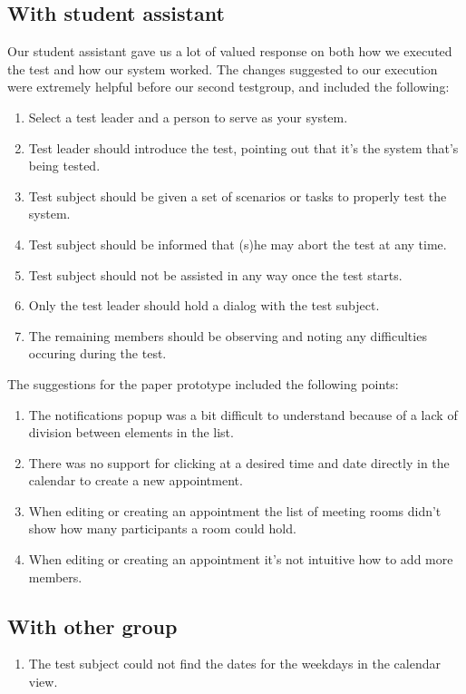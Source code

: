 \documentclass{article}
\begin{document}
\subsection{With student assistant}
Our student assistant gave us a lot of valued response on both how we executed the test and how our system worked. The changes suggested to our execution were extremely helpful before our second testgroup, and included the following:
\begin{enumerate}
\item Select a test leader and a person to serve as your system.
\item Test leader should introduce the test, pointing out that it's the system that's being tested. 
\item Test subject should be given a set of scenarios or tasks to properly test the system. 
\item Test subject should be informed that (s)he may abort the test at any time.
\item Test subject should not be assisted in any way once the test starts.
\item Only the test leader should hold a dialog with the test subject.
\item The remaining members should be observing and noting any difficulties occuring during the test.
\end{enumerate}

The suggestions for the paper prototype included the following points:
\begin{enumerate}
\item The notifications popup was a bit difficult to understand because of a lack of division between elements in the list.
\item There was no support for clicking at a desired time and date directly in the calendar to create a new appointment.
\item When editing or creating an appointment the list of meeting rooms didn't show how many participants a room could hold.
\item When editing or creating an appointment it's not intuitive how to add more members.
\end{enumerate}

\subsection{With other group}
\begin{enumerate}
\item The test subject could not find the dates for the weekdays in the calendar view.
\end{enumerate}
\end{document}
